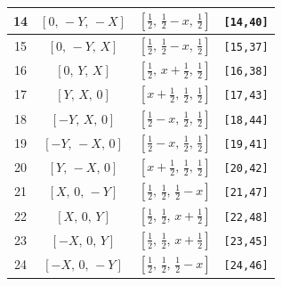 \documentclass[fleqn,8pt]{jsarticle}
\begin{document}
\begin{longtable}{cccc}
14 & $\left[ 0,\, - Y,\, - X \right]$ & $\left[ \frac{1}{2},\, \frac{1}{2} - x,\, \frac{1}{2} \right]$ & {\tt [14,40]} \\ \hline
15 & $\left[ 0,\, - Y,\, X \right]$ & $\left[ \frac{1}{2},\, \frac{1}{2} - x,\, \frac{1}{2} \right]$ & {\tt [15,37]} \\ \hline
16 & $\left[ 0,\, Y,\, X \right]$ & $\left[ \frac{1}{2},\, x + \frac{1}{2},\, \frac{1}{2} \right]$ & {\tt [16,38]} \\ \hline
17 & $\left[ Y,\, X,\, 0 \right]$ & $\left[ x + \frac{1}{2},\, \frac{1}{2},\, \frac{1}{2} \right]$ & {\tt [17,43]} \\ \hline
18 & $\left[ - Y,\, X,\, 0 \right]$ & $\left[ \frac{1}{2} - x,\, \frac{1}{2},\, \frac{1}{2} \right]$ & {\tt [18,44]} \\ \hline
19 & $\left[ - Y,\, - X,\, 0 \right]$ & $\left[ \frac{1}{2} - x,\, \frac{1}{2},\, \frac{1}{2} \right]$ & {\tt [19,41]} \\ \hline
20 & $\left[ Y,\, - X,\, 0 \right]$ & $\left[ x + \frac{1}{2},\, \frac{1}{2},\, \frac{1}{2} \right]$ & {\tt [20,42]} \\ \hline
21 & $\left[ X,\, 0,\, - Y \right]$ & $\left[ \frac{1}{2},\, \frac{1}{2},\, \frac{1}{2} - x \right]$ & {\tt [21,47]} \\ \hline
22 & $\left[ X,\, 0,\, Y \right]$ & $\left[ \frac{1}{2},\, \frac{1}{2},\, x + \frac{1}{2} \right]$ & {\tt [22,48]} \\ \hline
23 & $\left[ - X,\, 0,\, Y \right]$ & $\left[ \frac{1}{2},\, \frac{1}{2},\, x + \frac{1}{2} \right]$ & {\tt [23,45]} \\ \hline
24 & $\left[ - X,\, 0,\, - Y \right]$ & $\left[ \frac{1}{2},\, \frac{1}{2},\, \frac{1}{2} - x \right]$ & {\tt [24,46]} \\
\end{longtable}
\renewcommand{\arraystretch}{1.2}
\end{document}
